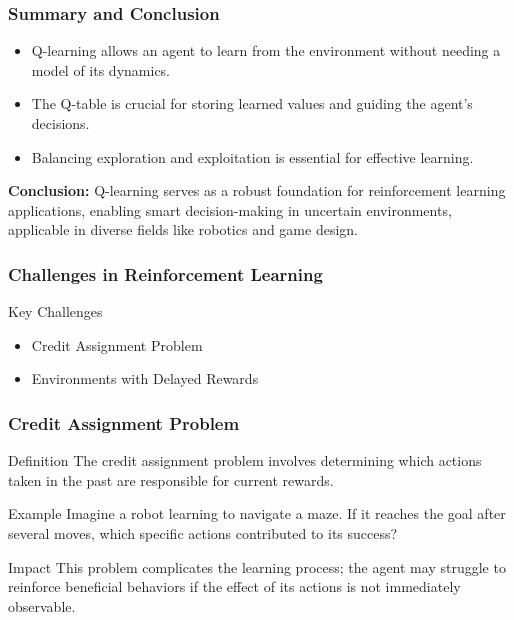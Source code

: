 \documentclass[aspectratio=169]{beamer}
\begin{document}
\begin{frame}
    \frametitle{Summary and Conclusion}
    \begin{itemize}
        \item Q-learning allows an agent to learn from the environment without needing a model of its dynamics.
        \item The Q-table is crucial for storing learned values and guiding the agent’s decisions.
        \item Balancing exploration and exploitation is essential for effective learning.
    \end{itemize}
    \textbf{Conclusion:} Q-learning serves as a robust foundation for reinforcement learning applications, enabling smart decision-making in uncertain environments, applicable in diverse fields like robotics and game design.
\end{frame}

\begin{frame}
    \frametitle{Challenges in Reinforcement Learning}
    \begin{block}{Key Challenges}
        \begin{itemize}
            \item Credit Assignment Problem
            \item Environments with Delayed Rewards
        \end{itemize}
    \end{block}
\end{frame}

\begin{frame}
    \frametitle{Credit Assignment Problem}
    \begin{block}{Definition}
        The credit assignment problem involves determining which actions taken in the past are responsible for current rewards.
    \end{block}
    \begin{block}{Example}
        Imagine a robot learning to navigate a maze. If it reaches the goal after several moves, which specific actions contributed to its success?
    \end{block}
    \begin{block}{Impact}
        This problem complicates the learning process; the agent may struggle to reinforce beneficial behaviors if the effect of its actions is not immediately observable.
    \end{block}
\end{frame}
\end{document}
